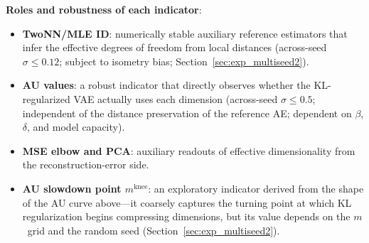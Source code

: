 \documentclass[make,article,submit,pdftex,moreauthors]{Definitions/mdpi}
\newcommand{\mknee}{m^{\mathrm{knee}}}
\begin{document}
\textbf{Roles and robustness of each indicator}:
\begin{itemize}
  \item \textbf{TwoNN/MLE ID}: numerically stable auxiliary reference
        estimators that infer the effective degrees of freedom from local distances
        (across-seed $\sigma \leq 0.12$; subject to isometry bias; Section~\ref{sec:exp_multiseed2}).
  \item \textbf{AU values}: a robust indicator that directly observes whether the
        KL-regularized VAE actually uses each dimension
        (across-seed $\sigma \leq 0.5$; independent of the distance preservation of the
        reference AE; dependent on $\beta$, $\delta$, and model capacity).
  \item \textbf{MSE elbow and PCA}: auxiliary readouts of effective
        dimensionality from the reconstruction-error side.
  \item \textbf{AU slowdown point $\mknee$}: an exploratory indicator derived
        from the shape of the AU curve above---it coarsely captures the turning
        point at which KL regularization begins compressing dimensions,
        but its value depends on the $m$~grid and the random seed (Section~\ref{sec:exp_multiseed2}).
\end{itemize}
\end{document}
